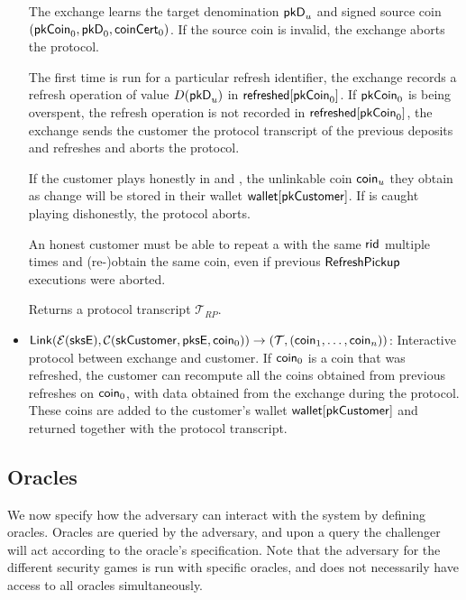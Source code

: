 \begin{itemize}
    The exchange learns the target denomination $\mathsf{pkD}_u$ and signed
    source coin $(\mathsf{pkCoin}_0, \mathsf{pkD}_0, \mathsf{coinCert}_0)$.  If the source
    coin is invalid, the exchange aborts the protocol.
    
    The first time  is run for a particular refresh
    identifier, the exchange records a  refresh operation of value
    $D(\mathsf{pkD}_u)$ in $\mathsf{refreshed}[\mathsf{pkCoin}_0]$.  If $\mathsf{pkCoin}_0$ is
    being overspent, the refresh operation is not recorded in
    $\mathsf{refreshed}[\mathsf{pkCoin}_0]$, the exchange sends the customer the protocol
    transcript of the previous deposits and refreshes and aborts the protocol.

    If the customer  plays honestly in  and
    , the unlinkable coin $\mathsf{coin}_u$ they obtain as change
    will be stored in their wallet $\mathsf{wallet}[\mathsf{pkCustomer}]$.  If  is
    caught playing dishonestly, the  protocol aborts.

    An honest customer must be able to repeat a  with the
    same $\mathsf{rid}$ multiple times and (re-)obtain the same coin, even if
    previous $\mathsf{RefreshPickup}$ executions were aborted.

    Returns a protocol transcript $\mathcal{T}_{RP}$.

  \item $\mathsf{Link}(\mathcal{E}(\mathsf{sksE}), \mathcal{C}(\mathsf{skCustomer}, \mathsf{pksE}, \mathsf{coin}_0)) \rightarrow (\mathcal{T}, (\mathsf{coin}_1, \dots, \mathsf{coin}_n))$:
    Interactive protocol between exchange and customer.  If $\mathsf{coin}_0$ is a
    coin that was refreshed, the customer can recompute all the coins obtained
    from previous refreshes on $\mathsf{coin}_0$, with data obtained from the
    exchange during the protocol.  These coins are added to the customer's
    wallet $\mathsf{wallet}[\mathsf{pkCustomer}]$ and returned together with the protocol
    transcript.

\end{itemize}

\subsection{Oracles}
We now specify how the adversary can interact with the system by defining
oracles.  Oracles are queried by the adversary, and upon a query the challenger
will act according to the oracle's specification.  Note that the adversary for
the different security games is run with specific oracles, and does not
necessarily have access to all oracles simultaneously.

